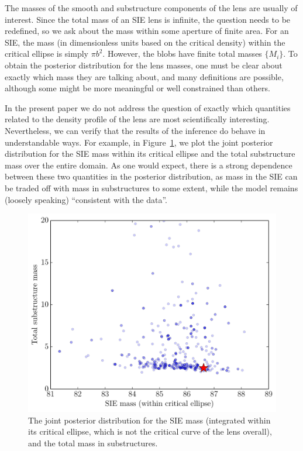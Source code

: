 \documentclass[useAMS,usenatbib]{mn2e}
\begin{document}
The masses of the smooth and substructure components of the lens are usually
of interest. Since the total mass of an SIE lens is infinite, the question
needs to be redefined, so we ask about the mass within some aperture of finite
area. For an SIE, the mass (in dimensionless units based on the critical density)
within the critical
ellipse is simply $\pi b^2$. However, the blobs have finite total masses
$\{M_i\}$. To obtain the posterior distribution for the lens masses, one must
be clear about exactly which mass they are talking about, and many definitions
are possible, although some might be more meaningful or well constrained than
others.

In the present paper we do not address the question of exactly which quantities
related to the
density profile of the lens are most scientifically interesting. Nevertheless,
we can verify that the results of the inference do behave in understandable
ways. For example, in Figure~\ref{fig:masses1},
we plot the joint posterior distribution
for the SIE mass within its critical ellipse and the total substructure mass
over the entire domain. As one would expect, there is a strong dependence
between these two quantities in the posterior distribution, as mass in the
SIE can be traded off with mass in substructures to some extent, while
the model remains (loosely speaking) ``consistent with the data''.
\begin{figure}
\begin{center}
\includegraphics[scale=0.4]{masses1.pdf}
\caption{The joint posterior distribution for the SIE mass (integrated within
its critical ellipse, which is not the critical curve of the lens overall),
and the total mass in substructures.\label{fig:masses1}}
\end{center}
\end{figure}
\end{document}
